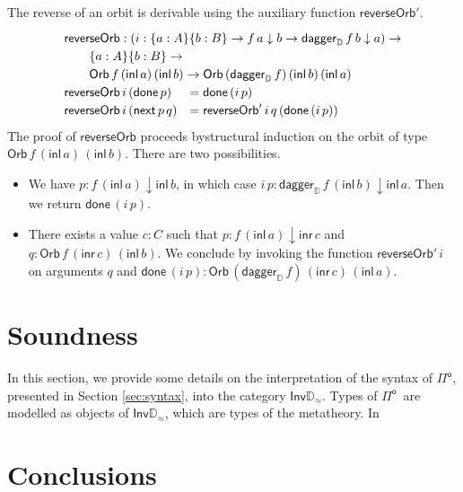 \documentclass[runningheads,a4paper]{llncs}
\newcommand{\Pio}{\ensuremath{\mathsf{\Pi}^{\mathsf{o}}}}
\newcommand{\inl}{\mathsf{inl}}
\newcommand{\inr}{\mathsf{inr}}
\newcommand{\Inv}{\mathsf{Inv}}
\newcommand{\dn}{\downarrow}
\newcommand{\D}{\mathbb{D}}
\newcommand{\Dapprox}{\mathbb{D}_{\approx}}
\newcommand{\daggerD}{\mathsf{dagger}_\D}
\newcommand{\Orb}[3]{\mathsf{Orb}\,#1\,#2\,#3}
\newcommand{\done}{\mathsf{done}}
\renewcommand{\next}{\mathsf{next}}
\newcommand{\reverseOrbit}{\mathsf{reverseOrb}}
\begin{document}
The reverse of an orbit is derivable using the auxiliary function $\reverseOrbit'$.
\[
\def\arraystretch{1.2}
\begin{array}{ll}
\multicolumn{2}{l}{\reverseOrbit : (i : \{a : A\} \{b : B\} \to f \,a
  \dn b \to \daggerD\,f  \,b \dn a) \to} \\
\multicolumn{2}{l}{\qquad \{a : A\} \{b : B\} \to} \\
\multicolumn{2}{l}{\qquad \Orb f {(\inl\,a)}
  {(\inl\,b)} \to \Orb  {(\daggerD\,f)} {(\inl\,b)} {(\inl\,a)}}\\
\reverseOrbit \,i\, (\done \,p) &= \done \, (i \,p) \\
\reverseOrbit \,i\,(\next\,p\,q) &= \reverseOrbit' \,i\,q \,(\done \,(i\,p))
\end{array}
\]
The proof of $\reverseOrbit$ proceeds bystructural induction on the
orbit of type
$\Orb f {(\inl\,a)} {(\inl\,b)}$. There are two possibilities.
\begin{itemize}
\item We have $p : f\,(\inl\,a) \dn
\inl\,b$, in which case $i\,p : \daggerD\,f\,(\inl\,b) \dn
\inl\,a$. Then we return $\done\,(i\,p)$.
\item There exists a value $c : C$ such that $p :
  f\,(\inl\,a) \dn \inr\,c$ and $q : \Orb f {(\inr\,c)}
  {(\inl\,b)}$. We conclude by invoking the function
  $\reverseOrbit' \,i$ on arguments $q$ and $\done\,(i\,p) : \Orb
  {(\daggerD \,f)} {(\inr\,c)} {(\inl\,a)}$.
\end{itemize}


\section{Soundness}\label{sec:interpretation}

In this section, we provide some details on the interpretation of the
syntax of \Pio, presented in Section \ref{sec:syntax}, into the
category $\Inv\Dapprox$. Types of \Pio\ are modelled as objects of
$\Inv\Dapprox$, which are types of the metatheory. In

\section{Conclusions}


%
%
%
%
%
%


\end{document}
